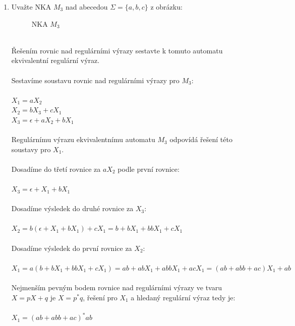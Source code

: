 \documentclass[a4paper,11pt]{article}[24.3.2010]
\begin{document}
\begin{enumerate}
  \item Uvažte NKA $M_{3}$ nad abecedou $\Sigma=\{a,b,c\}$ z obrázku:
  \begin{figure}[h!]
  \begin{center}
  \end{center}
  \caption{NKA $M_{3}$}
  \end{figure} \\
  Řešením rovnic nad regulárními výrazy sestavte k tomuto automatu ekvivalentní regulární výraz.\\\\
  Sestavíme soustavu rovnic nad regulárními výrazy pro $M_{3}$: \\\\
  $X_{1}=aX_{2}$ \\
  $X_{2}=bX_{3}+cX_{1}$ \\
  $X_{3}=\epsilon+aX_{2}+bX_{1}$ \\\\
  Regulárnímu výrazu ekvivalentnímu automatu $M_{3}$ odpovídá řešení této soustavy pro $X_{1}$.\\\\
  Dosadíme do třetí rovnice za $aX_{2}$ podle první rovnice:\\\\
  $X_{3}=\epsilon+X_{1}+bX_{1}$\\\\
  Dosadíme výsledek do druhé rovnice za $X_{3}$:\\\\
  $X_{2}=b(\epsilon+X_{1}+bX_{1})+cX_{1}=b+bX_{1}+bbX_{1}+cX_{1}$\\\\
  Dosadíme výsledek do první rovnice za $X_{2}$:\\\\
  $X_{1}=a(b+bX_{1}+bbX_{1}+cX_{1})=ab+abX_{1}+abbX_{1}+acX_{1}=(ab+abb+ac)X_{1}+ab$ \\\\
  Nejmenším pevným bodem rovnice nad regulárními výrazy ve tvaru $X=pX+q$ je $X=p^*q$, řešení pro $X_{1}$ a hledaný regulární výraz tedy je:\\\\
  $X_{1}=(ab+abb+ac)^*ab$\\


\end{enumerate}
\end{document}
